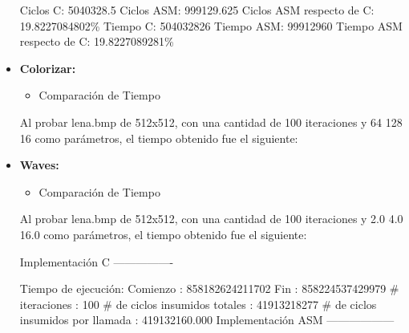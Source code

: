 \documentclass[10pt, a4paper]{article}
\begin{document}
\begin{itemize}
Ciclos C:                 5040328.5\newline
Ciclos ASM:               999129.625\newline
Ciclos ASM respecto de C: 19.8227084802\%\newline
Tiempo C:                 504032826\newline
Tiempo ASM:               99912960\newline
Tiempo ASM respecto de C: 19.8227089281\%\newline

\item {\textbf{Colorizar:}} 
\begin{itemize}
\item{Comparación de Tiempo}
\end{itemize}
Al probar lena.bmp de 512x512, con una cantidad de 100 iteraciones y 64 128 16 como parámetros, el tiempo obtenido fue el siguiente:\newline
\item {\textbf{Waves:}}

\begin{itemize}
\item{Comparación de Tiempo}
\end{itemize}
Al probar lena.bmp de 512x512, con una cantidad de 100 iteraciones y 2.0 4.0 16.0 como parámetros, el tiempo obtenido fue el siguiente:\newline

Implementación C\newline
----------------\newline

Tiempo de ejecución:\newline
  Comienzo                          : 858182624211702\newline
  Fin                               : 858224537429979\newline
  \# iteraciones                     : 100\newline
  \# de ciclos insumidos totales     : 41913218277\newline
  \# de ciclos insumidos por llamada : 419132160.000\newline
\newline
Implementación ASM\newline
------------------\newline


\end{itemize}
\end{document}
